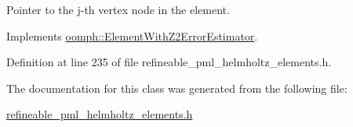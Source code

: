 Pointer to the j-\/th vertex node in the element. 



Implements \hyperlink{classoomph_1_1ElementWithZ2ErrorEstimator_a0eedccc33519f852c5dc2055ddf2774b}{oomph\+::\+Element\+With\+Z2\+Error\+Estimator}.



Definition at line 235 of file refineable\+\_\+pml\+\_\+helmholtz\+\_\+elements.\+h.



The documentation for this class was generated from the following file\+:\begin{DoxyCompactItemize}
\item 
\hyperlink{refineable__pml__helmholtz__elements_8h}{refineable\+\_\+pml\+\_\+helmholtz\+\_\+elements.\+h}\end{DoxyCompactItemize}
